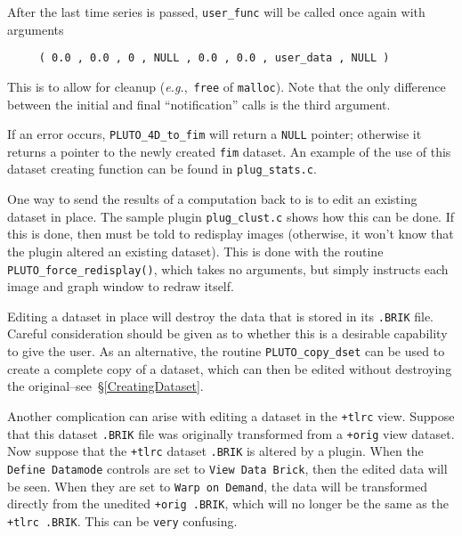   After the last time series is passed, {\tt user\_func} will be called once again with
  arguments
\begin{verbatim}
     ( 0.0 , 0.0 , 0 , NULL , 0.0 , 0.0 , user_data , NULL )
\end{verbatim}
  This is to allow for cleanup ({\it e.g.},~{\tt free} of {\tt malloc}).
  Note that the only difference between the initial and final
  ``notification'' calls is the third argument.

If an error occurs, {\tt PLUTO\_4D\_to\_fim} will return a {\tt NULL} pointer;
otherwise it returns a pointer to the newly created {\tt fim} dataset.
An example of the use of this dataset creating function can be
found in {\tt plug\_stats.c}.

\label{Sending}

One way to send the results of a computation back to \afni is
to edit an existing dataset in place.  The sample
plugin {\tt plug\_clust.c} shows how this can be done.
If this is done, then \afnit must be told to redisplay images
(otherwise, it won't know that the plugin altered an existing dataset).
This is done with the routine {\tt PLUTO\_force\_redisplay()}, which
takes no arguments, but simply instructs each \afnit image and graph
window to redraw itself.

Editing a dataset in place will destroy the
data that is stored in its {\tt .BRIK} file.  Careful consideration
should be given as to whether this is a desirable capability
to give the user.  As an alternative, the routine {\tt PLUTO\_copy\_dset} can be
used to create a complete copy of a dataset, which can then be
edited without destroying the original--see~\S\ref{CreatingDataset}.

Another complication can arise with editing a dataset in the {\tt +tlrc}
view.  Suppose that this dataset {\tt .BRIK} file
was originally transformed from a {\tt +orig} view dataset.
Now suppose that the {\tt +tlrc} dataset {\tt .BRIK} is altered
by a plugin.  When the {\tt Define Datamode} controls are
set to {\tt View Data Brick}, then the edited data will be
seen.  When they are set to {\tt Warp on Demand}, the data
will be transformed directly from the unedited {\tt +orig .BRIK},
which will no longer be the same as the {\tt +tlrc .BRIK}.
This can be {\tt very} confusing.

